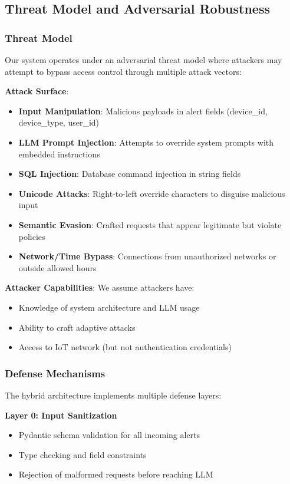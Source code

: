\subsection{Threat Model and Adversarial Robustness}

\subsubsection{Threat Model}

Our system operates under an adversarial threat model where attackers may attempt to bypass access control through multiple attack vectors:

\textbf{Attack Surface}:
\begin{itemize}
    \item \textbf{Input Manipulation}: Malicious payloads in alert fields (device\_id, device\_type, user\_id)
    \item \textbf{LLM Prompt Injection}: Attempts to override system prompts with embedded instructions
    \item \textbf{SQL Injection}: Database command injection in string fields
    \item \textbf{Unicode Attacks}: Right-to-left override characters to disguise malicious input
    \item \textbf{Semantic Evasion}: Crafted requests that appear legitimate but violate policies
    \item \textbf{Network/Time Bypass}: Connections from unauthorized networks or outside allowed hours
\end{itemize}

\textbf{Attacker Capabilities}: We assume attackers have:
\begin{itemize}
    \item Knowledge of system architecture and LLM usage
    \item Ability to craft adaptive attacks
    \item Access to IoT network (but not authentication credentials)
\end{itemize}

\subsubsection{Defense Mechanisms}

The hybrid architecture implements multiple defense layers:

\textbf{Layer 0: Input Sanitization}
\begin{itemize}
    \item Pydantic schema validation for all incoming alerts
    \item Type checking and field constraints
    \item Rejection of malformed requests before reaching LLM
\end{itemize}

